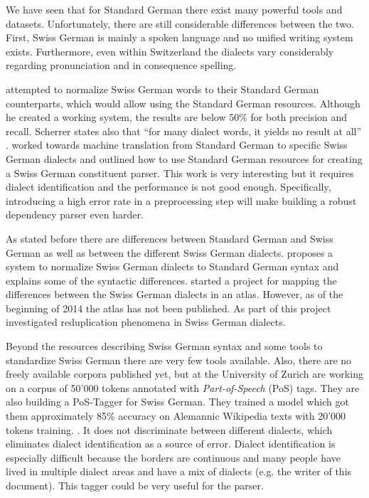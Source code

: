 \documentclass[11pt,letterpaper, covington]{article}
\begin{document}
We have seen that for Standard German there exist many powerful tools and datasets. Unfortunately, there are still considerable differences between the two. First, Swiss German is mainly a spoken language and no unified writing system exists. Furthermore, even within Switzerland the dialects vary considerably regarding pronunciation and in consequence spelling. 

\citet{Scherrer07} attempted to normalize Swiss German words to their Standard German counterparts, which would allow using the Standard German resources. Although he created a working system, the results are below 50\% for both precision and recall. Scherrer states also that ``for many dialect words, it yields no result at all'' \citep[p. 60]{Scherrer07}. \citet{SR10} worked towards machine translation from Standard German to specific Swiss German dialects and outlined how to use Standard German resources for creating a Swiss German constituent parser. This work is very interesting but it requires dialect identification and the performance is not good enough. Specifically, introducing a high error rate in a preprocessing step will make building a robust dependency parser even harder. 

As stated before there are differences between Standard German and Swiss German as well as between the different Swiss German dialects. \citet{Scherrer11} proposes a system to normalize Swiss German dialects to Standard German syntax and explains some of the syntactic differences. \citet{BG02} started a project for mapping the differences between the Swiss German dialects in an atlas. However, as of the beginning of 2014 the atlas has not been published. As part of this project \citet{GF06} investigated reduplication phenomena in Swiss German dialects. 

Beyond the resources describing Swiss German syntax and some tools to standardize Swiss German there are very few tools available. Also, there are no freely available corpora published yet, but \citet{AH14} at the University of Zurich are working on a corpus of 50'000 tokens annotated with \emph{Part-of-Speech} (PoS) tags. They are also building a PoS-Tagger for Swiss German. They trained a model which got them approximately 85\% accuracy on Alemannic Wikipedia texts with 20'000 tokens training. \citep{AH12}. It does not discriminate between different dialects, which eliminates dialect identification as a source of error. Dialect identification is especially difficult because the borders are continuous and many people have lived in multiple dialect areas and have a mix of dialects (e.g. the writer of this document). This tagger could be very useful for the parser.
\end{document}

